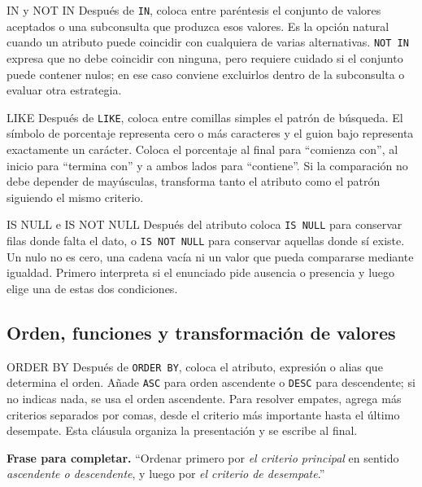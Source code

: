 \documentclass[11pt,a4paper]{article}
\newcommand{\campo}[1]{\texttt{#1}}
\begin{document}
\begin{plantilla}{IN y NOT IN}
Después de \campo{IN}, coloca entre paréntesis el conjunto de valores aceptados o una subconsulta que
produzca esos valores. Es la opción natural cuando un atributo puede coincidir con cualquiera de
varias alternativas. \campo{NOT IN} expresa que no debe coincidir con ninguna, pero requiere cuidado
si el conjunto puede contener nulos; en ese caso conviene excluirlos dentro de la subconsulta o
evaluar otra estrategia.
\end{plantilla}

\begin{plantilla}{LIKE}
Después de \campo{LIKE}, coloca entre comillas simples el patrón de búsqueda. El símbolo de porcentaje
representa cero o más caracteres y el guion bajo representa exactamente un carácter. Coloca el
porcentaje al final para ``comienza con'', al inicio para ``termina con'' y a ambos lados para
``contiene''. Si la comparación no debe depender de mayúsculas, transforma tanto el atributo como el
patrón siguiendo el mismo criterio.
\end{plantilla}

\begin{plantilla}{IS NULL e IS NOT NULL}
Después del atributo coloca \campo{IS NULL} para conservar filas donde falta el dato, o
\campo{IS NOT NULL} para conservar aquellas donde sí existe. Un nulo no es cero, una cadena vacía ni
un valor que pueda compararse mediante igualdad. Primero interpreta si el enunciado pide ausencia o
presencia y luego elige una de estas dos condiciones.
\end{plantilla}

\subsection{Orden, funciones y transformación de valores}

\begin{plantilla}{ORDER BY}
Después de \campo{ORDER BY}, coloca el atributo, expresión o alias que determina el orden. Añade
\campo{ASC} para orden ascendente o \campo{DESC} para descendente; si no indicas nada, se usa el orden
ascendente. Para resolver empates, agrega más criterios separados por comas, desde el criterio más
importante hasta el último desempate. Esta cláusula organiza la presentación y se escribe al final.

\textbf{Frase para completar.} ``Ordenar primero por \emph{el criterio principal} en sentido
\emph{ascendente o descendente}, y luego por \emph{el criterio de desempate}.''
\end{plantilla}
\end{document}
